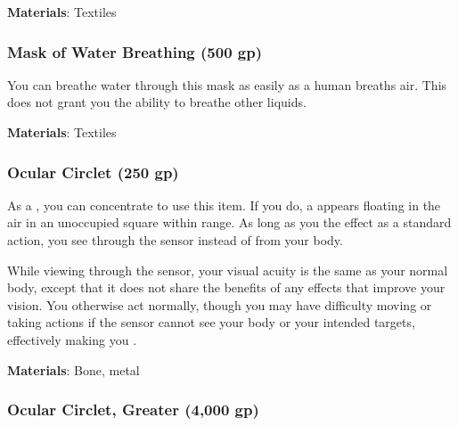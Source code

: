 \vspace{0.25em}
\textbf{Materials}: Textiles


\lowercase{\hypertarget{item:Mask of Water Breathing}{}}\label{item:Mask of Water Breathing}
\hypertarget{item:Mask of Water Breathing}{\subsubsection{Mask of Water Breathing\hfill{} (500 gp)}}

You can breathe water through this mask as easily as a human breaths air.
This does not grant you the ability to breathe other liquids.



\vspace{0.25em}
\textbf{Materials}: Textiles


\lowercase{\hypertarget{item:Ocular Circlet}{}}\label{item:Ocular Circlet}
\hypertarget{item:Ocular Circlet}{\subsubsection{Ocular Circlet\hfill{} (250 gp)}}

As a , you can concentrate to use this item.
If you do, a  appears floating in the air in an unoccupied square within \rngclose range.
As long as you  the effect as a standard action, you see through the sensor instead of from your body.

While viewing through the sensor, your visual acuity is the same as your normal body,
except that it does not share the benefits of any  effects that improve your vision.
You otherwise act normally, though you may have difficulty moving or taking actions if the sensor cannot see your body or your intended targets, effectively making you \blinded.



\vspace{0.25em}
\textbf{Materials}: Bone, metal


\lowercase{\hypertarget{item:Ocular Circlet, Greater}{}}\label{item:Ocular Circlet, Greater}
\hypertarget{item:Ocular Circlet, Greater}{\subsubsection{Ocular Circlet, Greater\hfill{} (4,000 gp)}}

